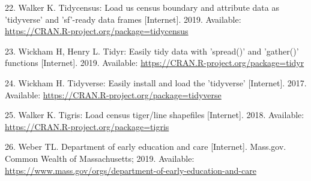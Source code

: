 \documentclass[10pt,letterpaper]{article}
\begin{document}
\hypertarget{ref-R-tidycensus}{}
22. Walker K. Tidycensus: Load us census boundary and attribute data as
'tidyverse' and 'sf'-ready data frames {[}Internet{]}. 2019. Available:
\url{https://CRAN.R-project.org/package=tidycensus}

\hypertarget{ref-R-tidyr}{}
23. Wickham H, Henry L. Tidyr: Easily tidy data with 'spread()' and
'gather()' functions {[}Internet{]}. 2019. Available:
\url{https://CRAN.R-project.org/package=tidyr}

\hypertarget{ref-R-tidyverse}{}
24. Wickham H. Tidyverse: Easily install and load the 'tidyverse'
{[}Internet{]}. 2017. Available:
\url{https://CRAN.R-project.org/package=tidyverse}

\hypertarget{ref-R-tigris}{}
25. Walker K. Tigris: Load census tiger/line shapefiles {[}Internet{]}.
2018. Available: \url{https://CRAN.R-project.org/package=tigris}

\hypertarget{ref-EEC}{}
26. Weber TL. Department of early education and care {[}Internet{]}.
Mass.gov. Common Wealth of Massachusetts; 2019. Available:
\url{https://www.mass.gov/orgs/department-of-early-education-and-care}

\nolinenumbers
\end{document}
